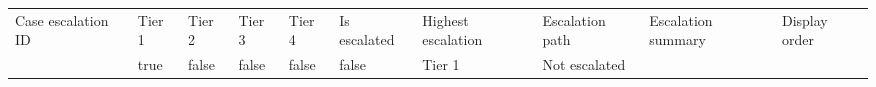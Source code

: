 \documentclass[10pt,openany,10pt]{book}
\newcounter{none}
\let\podeToprule\toprule
\let\podeMidrule\midrule
\let\podeBottomrule\bottomrule
\renewcommand{\toprule}{\arrayrulecolor{pbiGrid}\podeToprule}
\renewcommand{\midrule}{\arrayrulecolor{pbiGrid}\podeMidrule}
\renewcommand{\bottomrule}{\arrayrulecolor{pbiGrid}\podeBottomrule}
\begin{document}
{\def\LTcaptype{none} %
\begin{longtable}[]{@{}
  >{\raggedleft\arraybackslash}p{}
  >{\raggedright\arraybackslash}p{}
  >{\raggedright\arraybackslash}p{}
  >{\raggedright\arraybackslash}p{}
  >{\raggedright\arraybackslash}p{}
  >{\raggedright\arraybackslash}p{}
  >{\raggedright\arraybackslash}p{}
  >{\raggedright\arraybackslash}p{}
  >{\raggedright\arraybackslash}p{}
  >{\raggedleft\arraybackslash}p{}@{}}
\toprule\noalign{}
\begin{minipage}[b]{\linewidth}\raggedleft
Case escalation ID
\end{minipage} & \begin{minipage}[b]{\linewidth}\raggedright
Tier 1
\end{minipage} & \begin{minipage}[b]{\linewidth}\raggedright
Tier 2
\end{minipage} & \begin{minipage}[b]{\linewidth}\raggedright
Tier 3
\end{minipage} & \begin{minipage}[b]{\linewidth}\raggedright
Tier 4
\end{minipage} & \begin{minipage}[b]{\linewidth}\raggedright
Is escalated
\end{minipage} & \begin{minipage}[b]{\linewidth}\raggedright
Highest escalation
\end{minipage} & \begin{minipage}[b]{\linewidth}\raggedright
Escalation path
\end{minipage} & \begin{minipage}[b]{\linewidth}\raggedright
Escalation summary
\end{minipage} & \begin{minipage}[b]{\linewidth}\raggedleft
Display order
\end{minipage} \\
\midrule\noalign{}
\endhead
\bottomrule\noalign{}
\endlastfoot
1 & true & false & false & false & false & Tier 1 & Not escalated &

\end{longtable}}
\end{document}
